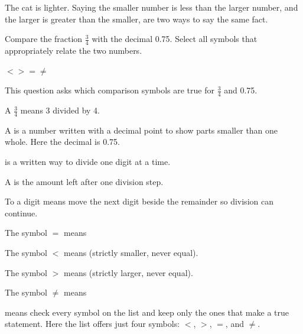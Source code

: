 
The cat is lighter. Saying the smaller number is less than the larger number, and the larger is greater than the smaller, are two ways to say the same fact.


\begin{samepage}
Compare the fraction $\frac{3}{4}$ with the decimal 0.75. Select all symbols that appropriately relate the two numbers.
\nopagebreak
\begin{center}
$<$\qquad $>$\qquad $=$\qquad $\neq$
\end{center}
\end{samepage}


This question asks which comparison symbols are true for $\frac{3}{4}$ and 0.75.

\begin{words}
  \item A $\frac{3}{4}$ means 3 divided by 4.
  \item A is a number written with a decimal point to show parts smaller than one whole. Here the decimal is 0.75.
  \item {}is a written way to divide one digit at a time.
  \item A is the amount left after one division step.
  \item To a digit means move the next digit beside the remainder so division can continue.
  \item The symbol $=$ means 
  \item The symbol $<$ means (strictly smaller, never equal).
  \item The symbol $>$ means (strictly larger, never equal).
  \item The symbol $\neq$ means 
  \item {}means check every symbol on the list and keep only the ones that make a
        true statement. Here the list offers just four symbols: $<$, $>$, $=$, and $\neq$.
\end{words}


